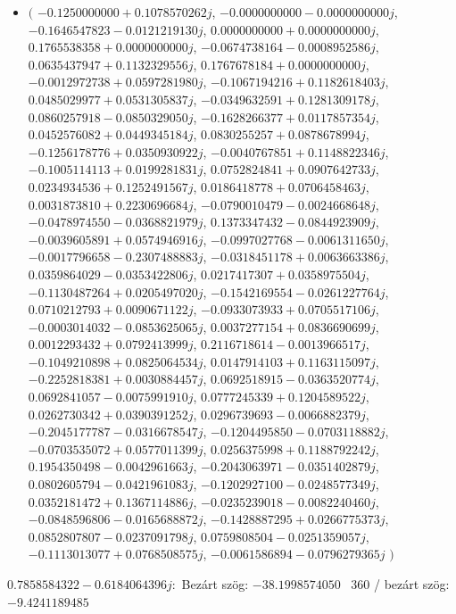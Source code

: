 \documentclass[14pt,a4paper]{article}
\begin{document}
\begin{itemize}
\item
$\big($
$-0.1250000000+0.1078570262j$, $-0.0000000000-0.0000000000j$, $-0.1646547823-0.0121219130j$, $0.0000000000+0.0000000000j$, $0.1765538358+0.0000000000j$, $-0.0674738164-0.0008952586j$, $0.0635437947+0.1132329556j$, $0.1767678184+0.0000000000j$, $-0.0012972738+0.0597281980j$, $-0.1067194216+0.1182618403j$, $0.0485029977+0.0531305837j$, $-0.0349632591+0.1281309178j$, $0.0860257918-0.0850329050j$, $-0.1628266377+0.0117857354j$, $0.0452576082+0.0449345184j$, $0.0830255257+0.0878678994j$, $-0.1256178776+0.0350930922j$, $-0.0040767851+0.1148822346j$, $-0.1005114113+0.0199281831j$, $0.0752824841+0.0907642733j$, $0.0234934536+0.1252491567j$, $0.0186418778+0.0706458463j$, $0.0031873810+0.2230696684j$, $-0.0790010479-0.0024668648j$, $-0.0478974550-0.0368821979j$, $0.1373347432-0.0844923909j$, $-0.0039605891+0.0574946916j$, $-0.0997027768-0.0061311650j$, $-0.0017796658-0.2307488883j$, $-0.0318451178+0.0063663386j$, $0.0359864029-0.0353422806j$, $0.0217417307+0.0358975504j$, $-0.1130487264+0.0205497020j$, $-0.1542169554-0.0261227764j$, $0.0710212793+0.0090671122j$, $-0.0933073933+0.0705517106j$, $-0.0003014032-0.0853625065j$, $0.0037277154+0.0836690699j$, $0.0012293432+0.0792413999j$, $0.2116718614-0.0013966517j$, $-0.1049210898+0.0825064534j$, $0.0147914103+0.1163115097j$, $-0.2252818381+0.0030884457j$, $0.0692518915-0.0363520774j$, $0.0692841057-0.0075991910j$, $0.0777245339+0.1204589522j$, $0.0262730342+0.0390391252j$, $0.0296739693-0.0066882379j$, $-0.2045177787-0.0316678547j$, $-0.1204495850-0.0703118882j$, $-0.0703535072+0.0577011399j$, $0.0256375998+0.1188792242j$, $0.1954350498-0.0042961663j$, $-0.2043063971-0.0351402879j$, $0.0802605794-0.0421961083j$, $-0.1202927100-0.0248577349j$, $0.0352181472+0.1367114886j$, $-0.0235239018-0.0082240460j$, $-0.0848596806-0.0165688872j$, $-0.1428887295+0.0266775373j$, $0.0852807807-0.0237091798j$, $0.0759808504-0.0251359057j$, $-0.1113013077+0.0768508575j$, $-0.0061586894-0.0796279365j$
$\big)$
\end{itemize}
$0.7858584322-0.6184064396j$:\
Bezárt szög: $-38.1998574050$ \
360 / bezárt szög: $-9.4241189485$\
\end{document}
